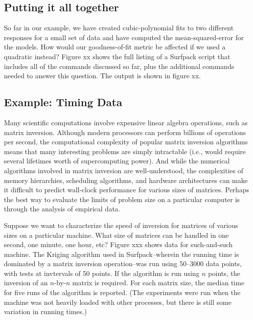 \documentclass{article}
\begin{document}
\subsection{Putting it all together}
So far in our example, we have created cubic-polynomial fits to two different responses for a small set of data and have computed the mean-squared-error for the models.  How would our goodness-of-fit metric be affected if we used a quadratic instead?  Figure xx shows the full listing of a Surfpack script that includes all of the commands discussed so far, plus the additional commands needed to answer this question. The output is shown in figure xx.


\subsection{Example: Timing Data}
Many scientific computations involve expensive linear algebra operations, such as matrix inversion.  Although modern processors can perform billions of operations per second, the computational complexity of popular matrix inversion algorithms means that many interesting problems are simply intractable (i.e., would require several lifetimes worth of supercomputing power).  And while the numerical algorithms involved in matrix inversion are well-understood, the complexities of memory hierarchies, scheduling algorithms, and hardware architectures can make it difficult to predict wall-clock performance for various sizes of matrices.  Perhaps the best way to evaluate the limits of problem size on a particular computer is through the analysis of empirical data.

Suppose we want to characterize the speed of inversion for matrices of various sizes on a particular machine.  What size of matrices can be handled in one second, one minute, one hour, etc?  Figure xxx shows data for such-and-such machine.  The Kriging algorithm used in Surfpack--wherein the running time is dominated by a matrix inversion operation--was run using 50--3000 data points, with tests at invtervals of 50 points.  If the algorithm is run using $n$ points, the inversion of an $n$-by-$n$ matrix is required.  For each matrix size, the median time for five runs of the algorithm is reported.  (The experiments were run when the machine was not heavily loaded with other processes, but there is still some variation in running times.)
\end{document}
